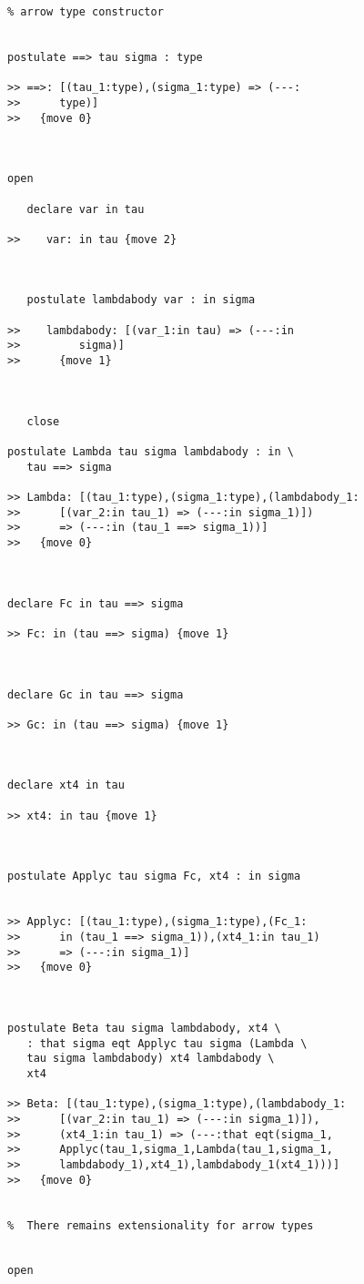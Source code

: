 \documentclass[12pt]{article}
\begin{document}
\begin{verbatim}
% arrow type constructor


postulate ==> tau sigma : type

>> ==>: [(tau_1:type),(sigma_1:type) => (---:
>>      type)]
>>   {move 0}



open

   declare var in tau

>>    var: in tau {move 2}



   postulate lambdabody var : in sigma

>>    lambdabody: [(var_1:in tau) => (---:in
>>         sigma)]
>>      {move 1}



   close

postulate Lambda tau sigma lambdabody : in \
   tau ==> sigma

>> Lambda: [(tau_1:type),(sigma_1:type),(lambdabody_1:
>>      [(var_2:in tau_1) => (---:in sigma_1)])
>>      => (---:in (tau_1 ==> sigma_1))]
>>   {move 0}



declare Fc in tau ==> sigma

>> Fc: in (tau ==> sigma) {move 1}



declare Gc in tau ==> sigma

>> Gc: in (tau ==> sigma) {move 1}



declare xt4 in tau

>> xt4: in tau {move 1}



postulate Applyc tau sigma Fc, xt4 : in sigma


>> Applyc: [(tau_1:type),(sigma_1:type),(Fc_1:
>>      in (tau_1 ==> sigma_1)),(xt4_1:in tau_1)
>>      => (---:in sigma_1)]
>>   {move 0}



postulate Beta tau sigma lambdabody, xt4 \
   : that sigma eqt Applyc tau sigma (Lambda \
   tau sigma lambdabody) xt4 lambdabody \
   xt4

>> Beta: [(tau_1:type),(sigma_1:type),(lambdabody_1:
>>      [(var_2:in tau_1) => (---:in sigma_1)]),
>>      (xt4_1:in tau_1) => (---:that eqt(sigma_1,
>>      Applyc(tau_1,sigma_1,Lambda(tau_1,sigma_1,
>>      lambdabody_1),xt4_1),lambdabody_1(xt4_1)))]
>>   {move 0}


%  There remains extensionality for arrow types


open


\end{verbatim}
\end{document}
